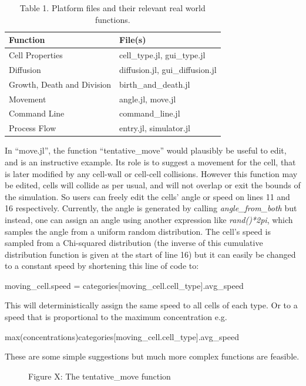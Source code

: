 \documentclass[12pt]{article}
\begin{document}
\begin{table}[H]
\centering
\begin{tabular}{ll}
\hline
{\bfseries Function} & {\bfseries File(s)} \\
\hline
Cell Properties & cell\_type.jl, gui\_type.jl \\
Diffusion & diffusion.jl, gui\_diffusion.jl \\
Growth, Death and Division & birth\_and\_death.jl \\
Movement & angle.jl, move.jl \\
Command Line & command\_line.jl \\
Process Flow & entry.jl, simulator.jl \\
\hline
\end{tabular}
\caption{Table 1. Platform files and their relevant real world 
functions.}
\end{table}

In ``move.jl'', the function ``tentative\_move'' would plausibly be 
useful to edit, and is an instructive example. Its role is to suggest a 
movement for the cell, that is later modified by any cell-wall or 
cell-cell collisions. However this function may be edited, cells will 
collide as per usual, and will not overlap or exit the bounds of the 
simulation. So users can freely edit the cells' angle or speed on lines 
11 and 16 respectively. Currently, the angle is generated by calling 
{\itshape angle\_from\_both} but instead, one can assign an angle using 
another expression like {\itshape rand()*2pi}, which samples the angle 
from a uniform random distribution. The cell's speed is sampled from a 
Chi-squared distribution (the inverse of this cumulative distribution 
function is given at the start of line 16) but it can easily be changed 
to a constant speed by shortening this line of code to:

{\fontsize{10pt}{10pt} \ttfamily
moving\_cell.speed = categories{[}moving\_cell.cell\_type{]}.avg\_speed} 

This will deterministically assign the same speed to all cells of 
each type. Or to a speed that is proportional to the maximum 
concentration e.g. 

{\fontsize{10pt}{10pt}\ttfamily 
max(concentrations)categories{[}moving\_cell.cell\_type{]}.avg\_speed} 

These are some simple suggestions but much more complex functions are 
feasible.

\begin{figure}[H]
\centering
\caption{Figure X: The tentative\_move function}
\end{figure}
\end{document}

